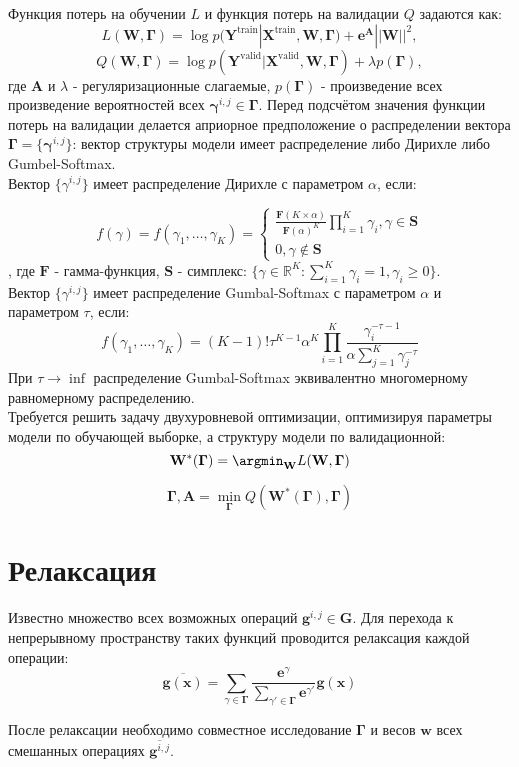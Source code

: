 \documentclass[12pt,twoside]{article}
\begin{document}
Функция потерь на обучении $L$ и функция потерь на валидации $Q$ задаются как:
\[
L (\mathbf{W}, \boldsymbol{\Gamma})= \log p(\mathbf{Y}^\text{train}|\mathbf{X}^\text{train}, \mathbf{W}, \boldsymbol{\Gamma}) + \boldsymbol{e}^{\mathbf{A}}||\mathbf{W}||^2,
\]
\[
Q (\mathbf{W}, \boldsymbol{\Gamma})= \log p(\mathbf{Y}^\text{valid}|\mathbf{X}^\text{valid}, \mathbf{W}, \boldsymbol{\Gamma}) + \lambda p(\boldsymbol{\Gamma}),
\]
где $\mathbf{A}$ и $\lambda$ - регуляризационные слагаемые, $p(\boldsymbol{\Gamma})$ - произведение всех произведение вероятностей всех $\boldsymbol{\gamma}^{i,j} \in \boldsymbol{\Gamma}$. Перед подсчётом значения  функции потерь на валидации делается априорное предположение  о распределении вектора
$\boldsymbol{\Gamma} = \{ \boldsymbol{\gamma}^{i,j}\}$: вектор структуры модели имеет распределение либо Дирихле\cite{Dirichlet} либо Gumbel-Softmax\cite{Gumbell}.
\\

Вектор $\{{\gamma}^{i,j}\}$ имеет распределение Дирихле с параметром $\alpha$, если:

\[
f(\gamma) = f(\gamma_1, \dots,\gamma_K) = 
\begin{cases}
\frac{\boldsymbol{F} (K\times\alpha)}{{\boldsymbol{F}(\alpha)}^{K}}\prod\limits_{i = 1}^K\gamma_i,\gamma \in \boldsymbol{S}
\\
0, \gamma\notin \boldsymbol{S}
\end{cases}
\],
где $\boldsymbol{F}$ - гамма-функция, $\boldsymbol{S}$ - симплекс: $\{\gamma \in \mathbb{R}^K: \sum_{i=1}^K \gamma_i = 1, \gamma_i \geqslant 0\}$.
\\

Вектор $\{{\gamma}^{i,j}\}$ имеет распределение Gumbal-Softmax с параметром $\alpha$ и параметром $\tau$, если:
\[
f(\gamma_1, \dots,\gamma_K) = (K-1)!\tau^{K-1}\alpha^K\prod\limits_{i = 1}^K\frac{\gamma_i^{-\tau - 1}}{\alpha\sum_{j=1}^K\gamma_j^{-\tau}}
\]
При $\tau\to\inf$ распределение Gumbal-Softmax эквивалентно многомерному равномерному распределению.
\\

Требуется решить задачу двухуровневой оптимизации, оптимизируя параметры модели по обучающей выборке, а структуру модели по валидационной: 
\[
\mathbf{W}^*( \boldsymbol{\Gamma}) = \argmin_{\mathbf{W}}
L (\mathbf{W}, \boldsymbol{\Gamma})\]

\[
\boldsymbol{\Gamma}, \mathbf{A} = \min_{\boldsymbol{\Gamma}} Q (\mathbf{W}^*( \boldsymbol{\Gamma}), \boldsymbol{\Gamma})
\]

\section{Релаксация}
Известно множество всех возможных операций $\mathbf{g}^{i,j} \in \mathbf{G}$. Для перехода к непрерывному пространству таких функций проводится релаксация каждой операции:
\[
\overline{\mathbf{g}(\mathbf{x})} = \sum_{\gamma \in  \boldsymbol{\Gamma}} \frac{\boldsymbol{e}^{\gamma}}{\sum_{\gamma' \in  \boldsymbol{\Gamma}}\boldsymbol{e}^{\gamma'}}\mathbf{g}(\mathbf{x})
\]

После релаксации необходимо совместное исследование $\boldsymbol{\Gamma}$ и весов $\boldsymbol{w}$ всех смешанных операциях $\overline{\mathbf{g}^{i,j}}$.




\end{document}

